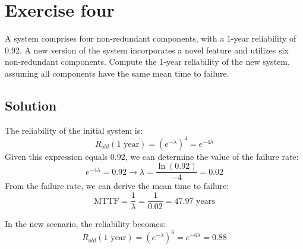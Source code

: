 \section{Exercise four}

A system comprises four non-redundant components, with a 1-year reliability of 0.92.
A new version of the system incorporates a novel feature and utilizes six non-redundant components.
Compute the 1-year reliability of the new system, assuming all components have the same mean time to failure.

\subsection*{Solution}
The reliability of the initial system is:
\[R_{old}(1 \text{ year})=\left(e^{-\lambda}\right)^4=e^{-4\lambda}\]
Given this expression equals $0.92$, we can determine the value of the failure rate:
\[e^{-4\lambda}=0.92\rightarrow \lambda=\dfrac{\ln(0.92)}{-4}=0.02\]
From the failure rate, we can derive the mean time to failure:
\[\text{MTTF}=\dfrac{1}{\lambda}=\dfrac{1}{0.02}=47.97\text{ years}\]

In the new scenario, the reliability becomes:
\[R_{old}(1 \text{ year})=\left(e^{-\lambda}\right)^6=e^{-6\lambda}=0.88\]